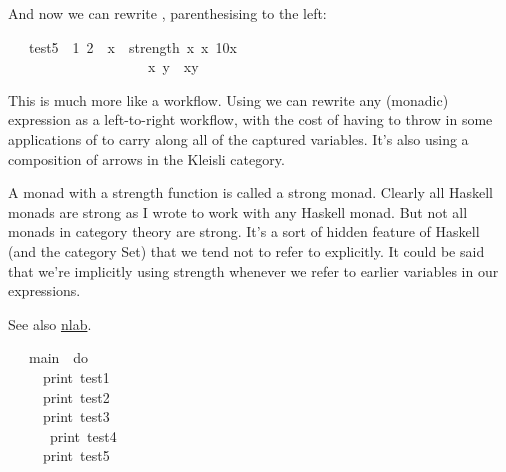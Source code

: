 \documentclass[12pt]{article}
\begin{document}
And now we can rewrite , parenthesising to the left:
\begin{tabbing}\ttfamily
~~~test5~~1~2~~x~~strength~x~x~10x\\
\ttfamily ~~~~~~~~~~~~~~~~~~~~x~y~~xy
\end{tabbing}
This is much more like a workflow. Using  we can rewrite any (monadic)  expression as a
left-to-right workflow, with the cost of having to throw in some applications of  to carry
along all of the captured variables. It's also using a composition of arrows in the Kleisli category.

A monad with a strength function is called a strong monad. Clearly all Haskell monads are strong as I
wrote  to work with any Haskell monad. But not all monads in category theory are strong.
It's a sort of hidden feature of Haskell (and the category Set) that we tend not to refer to explicitly.
It could be said that we're implicitly using strength whenever we refer to earlier variables in our
 expressions.

See also \href{https://ncatlab.org/nlab/show/strong+monad}{nlab}.
\begin{tabbing}\ttfamily
~~~main~~do\\
\ttfamily ~~~~~print~test1\\
\ttfamily ~~~~~print~test2\\
\ttfamily ~~~~~print~test3\\
\ttfamily ~~~~~~print~test4\\
\ttfamily ~~~~~print~test5
\end{tabbing}
\end{document}
